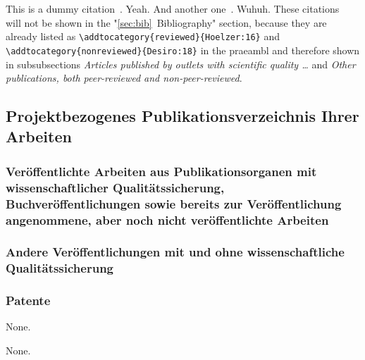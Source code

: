 \documentclass{scrartcl}
\begin{document}
This is a dummy citation~\cite{Hoelzer:17}. Yeah. And another
one~\cite{Gerst:18}. Wuhuh. These citations~\cite{Hoelzer:16, Desiro:18} will
not be shown in the "\ref{sec:bib}~Bibliography" section, because they are
already listed as \verb=\addtocategory{reviewed}{Hoelzer:16}= and
\verb=\addtocategory{nonreviewed}{Desiro:18}= in the praeambl and therefore
shown in subsubsections \emph{Articles published by outlets with scientific
quality \dots} and \emph{Other publications, both peer-reviewed and non-peer-reviewed}. 

\lipsum[1]


\subsection{Projektbezogenes Publikationsverzeichnis Ihrer Arbeiten}

\subsubsection{Veröffentlichte Arbeiten aus Publikationsorganen mit
  wissenschaftlicher Qualitätssicherung, Buchveröffentlichungen sowie
  bereits zur Veröffentlichung angenommene, aber noch nicht
  veröffentlichte Arbeiten}
\printbibliography[category=reviewed, heading=none]

\subsubsection{Andere Veröffentlichungen mit und ohne
  wissenschaftliche Qualitätssicherung}
\printbibliography[category=nonreviewed, heading=none]

\subsubsection{Patente}

\printbibliography[category=patents_pending, heading=none]
None.

\printbibliography[category=patents, heading=none]
None.

\end{document}
